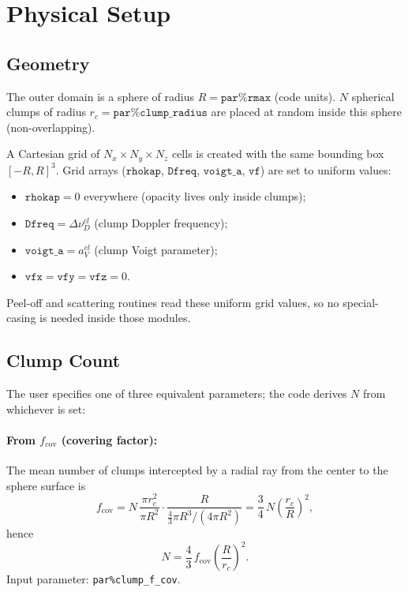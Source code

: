 \documentclass[english,a4paper]{my_memo}
\begin{document}
\section{Physical Setup}

\subsection{Geometry}

\begin{sloppypar}
The outer domain is a sphere of radius $R = \texttt{par\%rmax}$ (code units).
$N$ spherical clumps of radius $r_c = \texttt{par\%clump\_radius}$ are placed
at random inside this sphere (non-overlapping).
\end{sloppypar}

A Cartesian grid of $N_x \times N_y \times N_z$ cells is created with the
same bounding box $[-R, R]^3$.  Grid arrays ($\texttt{rhokap}$, $\texttt{Dfreq}$,
$\texttt{voigt\_a}$, $\texttt{vf}$) are set to uniform values:
\begin{itemize}
  \item $\texttt{rhokap} = 0$ everywhere (opacity lives only inside clumps);
  \item $\texttt{Dfreq} = \Delta\nu_D^{cl}$ (clump Doppler frequency);
  \item $\texttt{voigt\_a} = a_V^{cl}$ (clump Voigt parameter);
  \item $\texttt{vfx} = \texttt{vfy} = \texttt{vfz} = 0$.
\end{itemize}
Peel-off and scattering routines read these uniform grid values, so no
special-casing is needed inside those modules.

\subsection{Clump Count}

The user specifies one of three equivalent parameters; the code derives $N$
from whichever is set:

\paragraph{From $f_\mathrm{cov}$ (covering factor):}
The mean number of clumps intercepted by a radial ray from the center to the
sphere surface is
\begin{equation}
  f_\mathrm{cov} = N\,\frac{\pi r_c^2}{\pi R^2}\cdot\frac{R}{\frac{4}{3}\pi R^3/(4\pi R^2)}
  = \frac{3}{4}\,N\!\left(\frac{r_c}{R}\right)^2 ,
\end{equation}
hence
\begin{equation}
  N = \frac{4}{3}\,f_\mathrm{cov}\!\left(\frac{R}{r_c}\right)^2 .
\end{equation}
Input parameter: \texttt{par\%clump\_f\_cov}.
\end{document}
